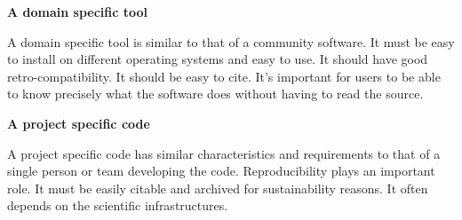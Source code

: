 \textbf{A domain specific tool}

A domain specific tool is similar to that of a community software. It must be easy to install on different operating systems and easy to use. It should have good retro-compatibility. It should be easy to cite. It's important for users to be able to know precisely what the software does without having to read the source. 

\textbf{A project specific code}

A project specific code has similar characteristics and requirements to that of a single person or team developing the code. Reproducibility plays an important role. It must be easily citable and archived for sustainability reasons. It often depends on the scientific infrastructures.
